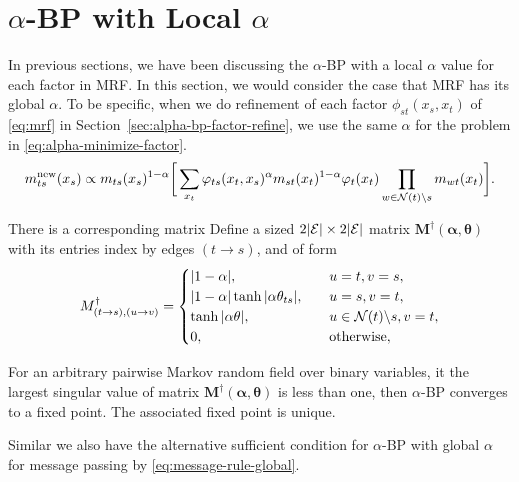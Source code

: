 \documentclass[conference,onecolumn]{IEEEtran}
\begin{document}
\section{$\alpha$-BP with Local $\alpha$}
In previous sections, we have been discussing the $\alpha$-BP with a local $\alpha$ value for each factor in MRF. In this section, we would consider the case that MRF has its global $\alpha$. To be specific, when we do refinement of each factor $\phi_{st}(x_s, x_t)$ of \eqref{eq:mrf} in Section~\ref{sec:alpha-bp-factor-refine}, we use the same $\alpha$
for the problem in \eqref{eq:alpha-minimize-factor}. 
\begin{equation}\label{eq:message-rule-global}
  {m}^{\text{new}}_{ts}(x_s) \propto  m_{ts}(x_s)^{1-\alpha} \bigg[
  \sum_{x_t} \varphi_{ts}(x_t, x_s)^{\alpha} {m}_{st}(x_t)^{1-\alpha} {\varphi}_t(x_t) \prod_{w\in \mathcal{N}(t)\backslash s}m_{wt}(x_t) \bigg].
\end{equation}

There is a corresponding matrix
Define a sized $2| \mathcal{E} | \times 2| \mathcal{E} |$ matrix $\bm{M}^{\dagger}(\bm{\alpha}, \bm{\theta})$ with its entries index by edges $(t\rightarrow s)$, and of form
\begin{equation}
  M^{\dagger}_{(t\rightarrow s), (u \rightarrow v)} =
  \begin{cases}
    |  1 - \alpha |, &\quad u=t, v=s, \\
    |  1 - \alpha | \tanh|  \alpha \theta_{ts} |, & \quad u = s, v =t, \\
    \tanh| \alpha \theta |, & \quad u \in \mathcal{N}(t)\backslash s, v = t, \\
    0, & \quad \mathrm{otherwise},
  \end{cases}
\end{equation}


\begin{cor}\label{cor:global-alpha-bp}
  For an arbitrary pairwise Markov random field over binary variables,
  it the largest singular value of matrix $\bm{M}^{\dagger}(\bm{\alpha}, \bm{\theta})$ is less than one,
  then $\alpha$-BP converges to a fixed point. The associated fixed
  point is unique.
\end{cor}

Similar we also have the alternative sufficient condition for $\alpha$-BP with global $\alpha$ for message passing by \eqref{eq:message-rule-global}.
\end{document}
